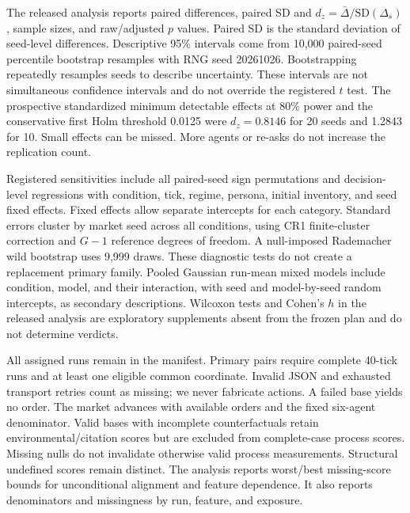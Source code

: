 \documentclass[a4paper]{article}
\begin{document}
The released analysis reports paired differences, paired SD and $d_z=\bar\Delta/\mathrm{SD}(\Delta_s)$, sample sizes, and raw/adjusted $p$ values. Paired SD is the standard deviation of seed-level differences. Descriptive 95\% intervals come from 10,000 paired-seed percentile bootstrap resamples with RNG seed 20261026. Bootstrapping repeatedly resamples seeds to describe uncertainty. These intervals are not simultaneous confidence intervals and do not override the registered $t$ test. The prospective standardized minimum detectable effects at 80\% power and the conservative first Holm threshold 0.0125 were $d_z=0.8146$ for 20 seeds and 1.2843 for 10. Small effects can be missed. More agents or re-asks do not increase the replication count.

Registered sensitivities include all paired-seed sign permutations and decision-level regressions with condition, tick, regime, persona, initial inventory, and seed fixed effects. Fixed effects allow separate intercepts for each category. Standard errors cluster by market seed across all conditions, using CR1 finite-cluster correction and $G-1$ reference degrees of freedom. A null-imposed Rademacher wild bootstrap uses 9,999 draws. These diagnostic tests do not create a replacement primary family. Pooled Gaussian run-mean mixed models include condition, model, and their interaction, with seed and model-by-seed random intercepts, as secondary descriptions. Wilcoxon tests and Cohen's $h$ in the released analysis are exploratory supplements absent from the frozen plan and do not determine verdicts.

All assigned runs remain in the manifest. Primary pairs require complete 40-tick runs and at least one eligible common coordinate. Invalid JSON and exhausted transport retries count as missing; we never fabricate actions. A failed base yields no order. The market advances with available orders and the fixed six-agent denominator. Valid bases with incomplete counterfactuals retain environmental/citation scores but are excluded from complete-case process scores. Missing nulls do not invalidate otherwise valid process measurements. Structural undefined scores remain distinct. The analysis reports worst/best missing-score bounds for unconditional alignment and feature dependence. It also reports denominators and missingness by run, feature, and exposure.
\end{document}
